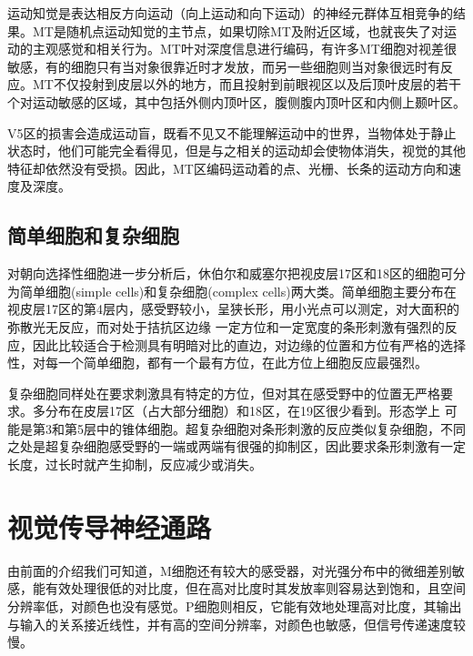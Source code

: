 \documentclass[a4paper,10pt]{article}\large
\begin{document}
运动知觉是表达相反方向运动（向上运动和向下运动）的神经元群体互相竞争的结果。MT是随机点运动知觉的主节点，如果切除MT及附近区域，也就丧失了对运动的主观感觉和相关行为\cite{15:book}。MT叶对深度信息进行编码，有许多MT细胞对视差很敏感，有的细胞只有当对象很靠近时才发放，而另一些细胞则当对象很远时有反应。MT不仅投射到皮层以外的地方，而且投射到前眼视区以及后顶叶皮层的若干个对运动敏感的区域，其中包括外侧内顶叶区，腹侧腹内顶叶区和内侧上颞叶区。
       


 V5区的损害会造成运动盲\cite{12:book}，既看不见又不能理解运动中的世界，当物体处于静止状态时，他们可能完全看得见，但是与之相关的运动却会使物体消失，视觉的其他特征却依然没有受损。因此，MT区编码运动着的点、光栅、长条的运动方向和速度及深度。


\subsection{简单细胞和复杂细胞}


对朝向选择性细胞进一步分析后，休伯尔和威塞尔把视皮层17区和18区的细胞可分为简单细胞(simple cells)和复杂细胞(complex cells)\cite{12:book}两大类。简单细胞主要分布在视皮层17区的第4层内，感受野较小，呈狭长形，用小光点可以测定，对大面积的弥散光无反应，而对处于拮抗区边缘 一定方位和一定宽度的条形刺激有强烈的反应，因此比较适合于检测具有明暗对比的直边，对边缘的位置和方位有严格的选择性，对每一个简单细胞，都有一个最有方位\cite{15:book}，在此方位上细胞反应最强烈。
       


复杂细胞\cite{15:book}同样处在要求刺激具有特定的方位，但对其在感受野中的位置无严格要求。多分布在皮层17区（占大部分细胞）和18区，在19区很少看到。形态学上 可能是第3和第5层中的锥体细胞。超复杂细胞对条形刺激的反应类似复杂细胞，不同之处是超复杂细胞感受野的一端或两端有很强的抑制区，因此要求条形刺激有一定长度，过长时就产生抑制，反应减少或消失。



\section{视觉传导神经通路}



由前面的介绍我们可知道，M细胞还有较大的感受器，对光强分布中的微细差别敏感，能有效处理很低的对比度，但在高对比度时其发放率则容易达到饱和，且空间分辨率低，对颜色也没有感觉。P细胞则相反，它能有效地处理高对比度，其输出与输入的关系接近线性，并有高的空间分辨率，对颜色也敏感，但信号传递速度较慢\cite{14:misc}。
        
\end{document}
